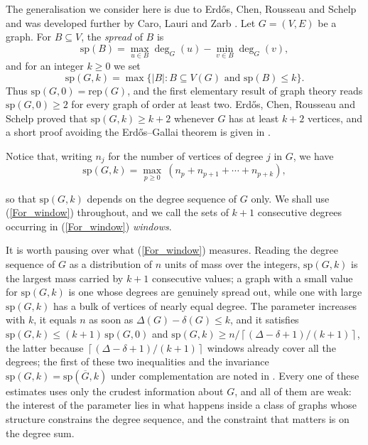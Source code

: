 \documentclass[10pt,a4paper]{article}
\begin{document}


The generalisation we consider here is due to Erd\H{o}s, Chen, Rousseau and Schelp \cite{Erdos} and
was developed further by Caro, Lauri and Zarb \cite{CaroLauriZarb}. Let $G=(V,E)$ be a graph. For
$B\subseteq V$, the \emph{spread} of $B$ is
\[
\mathrm{sp}(B)=\max_{u\in B}\deg _{G}(u)-\min_{v\in B}\deg _{G}(v),
\]
and for an integer $k\geq 0$ we set
\[
\mathrm{sp}(G,k)=\max \{\left\vert B\right\vert :B\subseteq V(G)\text{ and }\mathrm{sp}
(B)\leq k\}.
\]
Thus $\mathrm{sp}(G,0)=\mathrm{rep}(G)$, and the first elementary result of graph theory reads
$\mathrm{sp}(G,0)\geq 2$ for every graph of order at least two. Erd\H{o}s, Chen, Rousseau and
Schelp proved that $\mathrm{sp}(G,k)\geq k+2$ whenever $G$ has at least $k+2$ vertices, and a short
proof avoiding the Erd\H{o}s--Gallai theorem is given in \cite{CaroLauriZarb}.

Notice that, writing $n_{j}$ for the number of vertices of degree $j$ in $G$, we have
\begin{equation}
\mathrm{sp}(G,k)=\max_{p\geq 0}\ (n_{p}+n_{p+1}+\cdots +n_{p+k}),  \label{For_window}%
\end{equation}


so that $\mathrm{sp}(G,k)$ depends on the degree sequence of $G$ only. We shall use
(\ref{For_window}) throughout, and we call the sets of $k+1$ consecutive degrees occurring in
(\ref{For_window}) \emph{windows}.

It is worth pausing over what (\ref{For_window}) measures. Reading the degree sequence of $G$ as a
distribution of $n$ units of mass over the integers, $\mathrm{sp}(G,k)$ is the largest mass carried by
$k+1$ consecutive values; a graph with a small value for $\mathrm{sp}(G,k)$ is one whose degrees are genuinely spread out,
while one with large $\mathrm{sp}(G,k)$ has a bulk of vertices of nearly equal degree. The
parameter increases with $k$, it equals $n$ as soon as $\Delta (G)-\delta (G)\leq k$, and it satisfies
$\mathrm{sp}(G,k)\leq (k+1)\,\mathrm{sp}(G,0)$ and
$\mathrm{sp}(G,k)\geq n/\left\lceil (\Delta -\delta +1)/(k+1)\right\rceil $, the latter because
$\left\lceil (\Delta -\delta +1)/(k+1)\right\rceil $ windows already cover all the degrees; the first of
these two inequalities and the invariance $\mathrm{sp}(G,k)=\mathrm{sp}(\overline{G},k)$ under
complementation are noted in \cite{CaroLauriZarb}. Every one of these estimates uses only the crudest
information about $G$, and all of them are weak: the interest of the parameter lies in what happens
inside a class of graphs whose structure constrains the degree sequence, and the constraint that matters
is on the degree sum.
\end{document}
